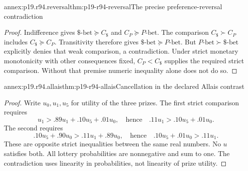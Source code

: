 \begin{annexitem}{annex:p19.r94.reversal}{thm:p19-r94-reversal}{The precise preference-reversal contradiction}
\begin{proof}
Indifference gives \(\$\text{-bet}\succeq C_{\$}\) and
\(C_P\succeq P\text{-bet}\). The comparison
\(C_{\$}\succ C_P\) includes \(C_{\$}\succeq C_P\).
Transitivity therefore gives \(\$\text{-bet}\succeq P\text{-bet}\).
But \(P\text{-bet}\succ\$\text{-bet}\) explicitly denies that
weak comparison, a contradiction. Under strict monetary monotonicity with
other consequences fixed, \(C_P<C_{\$}\) supplies the required strict
comparison. Without that premise numeric inequality alone does not do so.
\end{proof}
\end{annexitem}

\begin{annexitem}{annex:p19.r94.allais}{thm:p19-r94-allais}{Cancellation in the declared Allais contrast}
\begin{proof}
Write \(u_0,u_1,u_5\) for utility of the three prizes. The first strict
comparison requires
\[
    u_1>.89u_1+.10u_5+.01u_0,
       \quad\text{hence}\quad .11u_1>.10u_5+.01u_0.
\]
The second requires
\[
    .10u_5+.90u_0>.11u_1+.89u_0,
       \quad\text{hence}\quad .10u_5+.01u_0>.11u_1.
\]
These are opposite strict inequalities between the same real numbers.
No \(u\) satisfies both. All lottery probabilities are nonnegative
and sum to one. The contradiction uses linearity in probabilities, not
linearity of prize utility.
\end{proof}
\end{annexitem}
